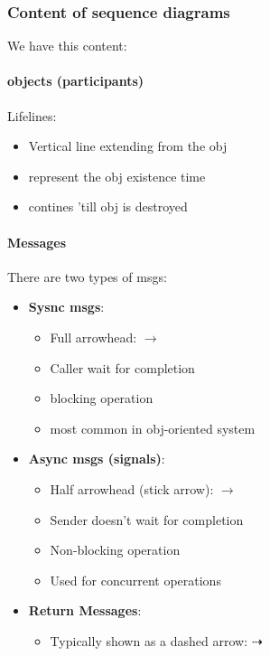 \subsubsection{Content of sequence diagrams}
We have this content:
\paragraph{objects (participants)}

Lifelines:
\begin{itemize}
    \item Vertical line extending from the obj
    \item represent the obj existence time
    \item contines 'till obj is destroyed
\end{itemize}
\paragraph{Messages} There are two types of msgs:
\begin{itemize}
    \item \textbf{Sysnc msgs}:
    \begin{itemize}
        \item Full arrowhead: $ \longrightarrow $
        \item Caller wait for completion
        \item blocking operation
        \item most common in obj-oriented system
    \end{itemize}
    \item \textbf{Async msgs (signals)}:
    \begin{itemize}
        \item Half arrowhead (stick arrow): $ \rightarrow $
        \item Sender doesn't wait for completion
        \item Non-blocking operation
        \item Used for concurrent operations
    \end{itemize}
    \item \textbf{Return Messages}:
    \begin{itemize}
        \item Typically shown as a dashed arrow: $ \dashrightarrow $
    \end{itemize}
\end{itemize}
